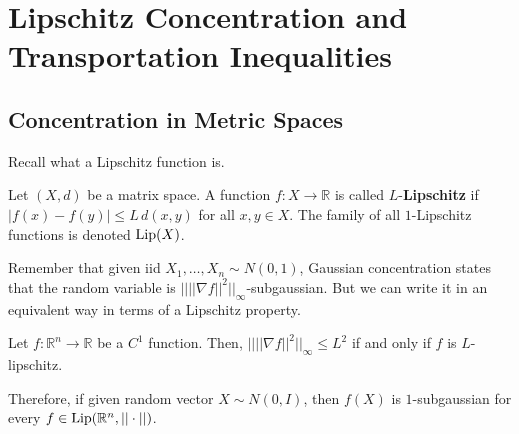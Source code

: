 \section{Lipschitz Concentration and Transportation Inequalities}

\subsection{Concentration in Metric Spaces}

  Recall what a Lipschitz function is. 

  \begin{definition}
  Let $(X, d)$ be a matrix space. A function $f: X \rightarrow \mathbb{R}$ is called $L$-\textbf{Lipschitz} if $|f(x) - f(y)| \leq L \, d(x, y)$ for all $x, y \in X$. The family of all $1$-Lipschitz functions is denoted $\operatorname{Lip}(X)$. 
  \end{definition}

  Remember that given iid $X_1, \ldots, X_n \sim N(0, 1)$, Gaussian concentration states that the random variable is $|| ||\nabla f||^2 ||_\infty$-subgaussian. But we can write it in an equivalent way in terms of a Lipschitz property. 

  \begin{lemma}
  Let $f: \mathbb{R}^n \rightarrow \mathbb{R}$ be a $C^1$ function. Then, $|| ||\nabla f||^2 ||_\infty \leq L^2$ if and only if $f$ is $L$-lipschitz. 
  \end{lemma}

  Therefore, if given random vector $X \sim N(0, I)$, then $f(X)$ is $1$-subgaussian for every $f \in \operatorname{Lip}(\mathbb{R}^n, ||\cdot||)$. 

